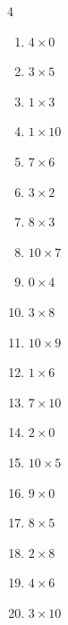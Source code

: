 \begin{multicols}{4}
\begin{enumerate}
  \item $4\times 0$
        \phantom{$=0$}

  \item $3\times 5$
        \phantom{$=15$}

  \item $1\times 3$
        \phantom{$=3$}

  \item $1\times 10$
        \phantom{$=10$}

  \item $7\times 6$
        \phantom{$=42$}

  \item $3\times 2$
        \phantom{$=6$}

  \item $8\times 3$
        \phantom{$=24$}

  \item $10\times 7$
        \phantom{$=70$}

  \item $0\times 4$
        \phantom{$=0$}

  \item $3\times 8$
        \phantom{$=24$}

  \item $10\times 9$
        \phantom{$=90$}

  \item $1\times 6$
        \phantom{$=6$}

  \item $7\times 10$
        \phantom{$=70$}

  \item $2\times 0$
        \phantom{$=0$}

  \item $10\times 5$
        \phantom{$=50$}

  \item $9\times 0$
        \phantom{$=0$}

\columnbreak %

\resetques

  \item $8\times 5$
        \phantom{$=40$}

  \item $2\times 8$
        \phantom{$=16$}

  \item $4\times 6$
        \phantom{$=24$}

  \item $3\times 10$
        \phantom{$=30$}


\end{enumerate}
\end{multicols}

